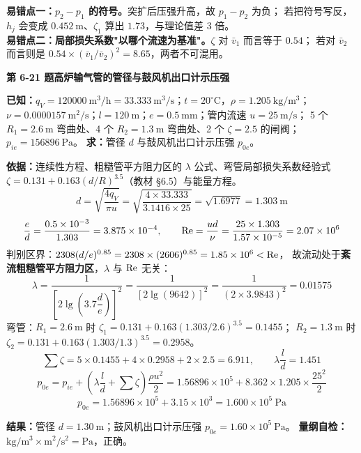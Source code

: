 \begin{yicuo}
\textbf{易错点一：$p_2-p_1$ 的符号。}突扩后压强升高，故 $p_1-p_2$ 为负；
若把符号写反，$h_j$ 会变成 $0.452\ \mathrm{m}$、$\zeta_1$ 算出 $1.73$，与理论值差 3 倍。\\
\textbf{易错点二：局部损失系数"以哪个流速为基准"。}$\zeta$ 对 $\bar v_1$ 而言等于 $0.54$；
若对 $\bar v_2$ 而言则是 $0.54\times(\bar v_1/\bar v_2)^2=8.65$，两者不可混用。
\end{yicuo}

\noindent\textbf{第 6-21 题\quad 高炉输气管的管径与鼓风机出口计示压强}

\begin{jie}
\textbf{已知：}$q_V=120000\ \mathrm{m^3/h}=33.333\ \mathrm{m^3/s}$；$t=20^\circ\mathrm{C}$，$\rho=1.205\ \mathrm{kg/m^3}$；
$\nu=0.0000157\ \mathrm{m^2/s}$；$l=120\ \mathrm{m}$；$e=0.5\ \mathrm{mm}$；管内流速 $u=25\ \mathrm{m/s}$；
5 个 $R_1=2.6\ \mathrm{m}$ 弯曲处、4 个 $R_2=1.3\ \mathrm{m}$ 弯曲处、2 个 $\zeta=2.5$ 的闸阀；$p_{ie}=156896\ \mathrm{Pa}$。
\textbf{求：}管径 $d$ 与鼓风机出口计示压强 $p_{0e}$。

\textbf{依据：}连续性方程、粗糙管平方阻力区的 $\lambda$ 公式、弯管局部损失系数经验式
$\zeta=0.131+0.163(d/R)^{3.5}$（教材 \S 6.5）与能量方程。
\[ d=\sqrt{\frac{4q_V}{\pi u}}=\sqrt{\frac{4\times33.333}{3.1416\times25}}=\sqrt{1.6977}=1.303\ \mathrm{m} \]
\[ \frac ed=\frac{0.5\times10^{-3}}{1.303}=3.875\times10^{-4},\qquad
\mathrm{Re}=\frac{ud}{\nu}=\frac{25\times1.303}{1.57\times10^{-5}}=2.07\times10^6 \]
判别区界：$2308(d/e)^{0.85}=2308\times(2606)^{0.85}=1.85\times10^6<\mathrm{Re}$，
故流动处于\textbf{紊流粗糙管平方阻力区}，$\lambda$ 与 $\mathrm{Re}$ 无关：
\[ \lambda=\frac{1}{\left[2\lg\left(3.7\dfrac de\right)\right]^2}
=\frac{1}{\left[2\lg(9642)\right]^2}=\frac{1}{(2\times3.9843)^2}=0.01575 \]
弯管：$R_1=2.6\ \mathrm{m}$ 时 $\zeta_1=0.131+0.163(1.303/2.6)^{3.5}=0.1455$；
$R_2=1.3\ \mathrm{m}$ 时 $\zeta_2=0.131+0.163(1.303/1.3)^{3.5}=0.2958$。
\[ \sum\zeta=5\times0.1455+4\times0.2958+2\times2.5=6.911,\qquad \lambda\frac ld=1.451 \]
\[ p_{0e}=p_{ie}+\left(\lambda\frac ld+\sum\zeta\right)\frac{\rho u^2}{2}
=1.56896\times10^5+8.362\times1.205\times\frac{25^2}{2} \]
\[ p_{0e}=1.56896\times10^5+3.15\times10^3=1.600\times10^5\ \mathrm{Pa} \]

\textbf{结果：}管径 $d=1.30\ \mathrm{m}$；鼓风机出口计示压强 $p_{0e}=1.60\times10^5\ \mathrm{Pa}$。
\textbf{量纲自检：}$\mathrm{kg/m^3\times m^2/s^2}=\mathrm{Pa}$，正确。
\end{jie}

